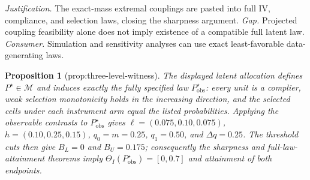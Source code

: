 \documentclass{article}
\newtheorem{proposition}{Proposition}
\begin{document}
\par\smallskip\noindent \textit{Justification.} The exact-mass extremal couplings are pasted into full IV, compliance, and selection laws, closing the sharpness argument. \textit{Gap.} Projected coupling feasibility alone does not imply existence of a compatible full latent law. \textit{Consumer.} Simulation and sensitivity analyses can use exact least-favorable data-generating laws.

\begin{proposition}[prop:three-level-witness]\label{prop:three-level-witness}
The displayed latent allocation defines \(P^{\star}\in\mathcal M\) and induces exactly the fully specified law \(P_{\mathrm{obs}}^{\star}\): every unit is a complier, weak selection monotonicity holds in the increasing direction, and the selected cells under each instrument arm equal the listed probabilities. Applying the observable contrasts to \(P_{\mathrm{obs}}^{\star}\) gives \(\ell=(0.075,0.10,0.075)\), \(h=(0.10,0.25,0.15)\), \(q_0=m=0.25\), \(q_1=0.50\), and \(\Delta q=0.25\). The threshold cuts then give \(B_L=0\) and \(B_U=0.175\); consequently the sharpness and full-law-attainment theorems imply \(\Theta_I(P_{\mathrm{obs}}^{\star})=[0,0.7]\) and attainment of both endpoints.
\end{proposition}
\end{document}
